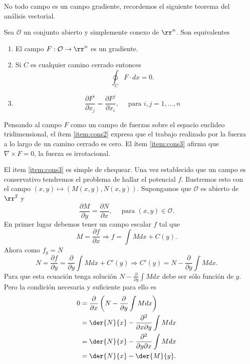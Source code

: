 No todo campo es un campo gradiente, recordemos el siguiente teorema del análisis vectorial.

 \begin{teorema}\label{teo:campo_cons} Sea $\mathcal{O}$ un conjunto abierto y simplemente conexo de $\rr^n$. Son equivalentes
 \begin{enumerate}
  \item\label{item:cons1} El campo $F:\mathcal{O}\to\rr^n$ es un gradiente.
  \item\label{item:cons2} Si $C$ es cualquier camino cerrado entonces
  \[\ointctrclockwise_C F\cdot d x=0.\]
  \item\label{item:cons3} \[\frac{\partial F^i}{\partial x_j}=\frac{\partial F^j}{\partial x_i},\quad\text{ para }i,j=1,\ldots,n\]
 \end{enumerate}

\end{teorema}

Pensando al campo $F$ como un campo de  fuerzas sobre el espacio euclideo tridimensional,  el ítem \ref{item:cons2} expresa que el trabajo realizado por la fuerza a lo largo de un camino cerrado es cero. El ítem \ref{item:cons3} afirma que $\nabla\times F=0$, la fuerza es irrotacional.


El item \ref{item:cons3}  es simple de chequear. Una vez establecido que un campo es conservativo tendremos el problema de hallar el potencial $f$.
Ilustremos esto con el campo $(x,y)\mapsto (M(x,y),N(x,y))$. Supongamos que $\mathcal{O}$ es abierto de $\rr^2$ y
\[\frac{\partial M}{\partial y}=\frac{\partial N}{\partial x},\quad\text{ para } (x,y)\in \mathcal{O}.\]
En primer lugar debemos tener un campo escalar $f$ tal que
\[M=\frac{\partial f}{\partial x}\Rightarrow f=\int Mdx +C(y).\]
Ahora como $f_y=N$
\[N=\frac{\partial f}{\partial y}=\frac{\partial}{\partial y}\int Mdx +C'(y)\Rightarrow C'(y)=N-\frac{\partial}{\partial y}\int Mdx .\]
 Para que esta ecuación tenga solución $N-\frac{\partial}{\partial y}\int Mdx$ debe ser sólo función de $y$. Pero la condición necesaria y suficiente para ello es
\[\begin{split}0&=\frac{\partial}{\partial x}\left(N-\frac{\partial}{\partial y}\int Mdx\right)\\
&= \der{N}{x}-\frac{\partial^2}{\partial x\partial y}\int Mdx\\
&=\der{N}{x}-\frac{\partial^2}{\partial y\partial x}\int Mdx\\
&=\der{N}{x}-\der{M}{y}.
   \end{split}
\]

